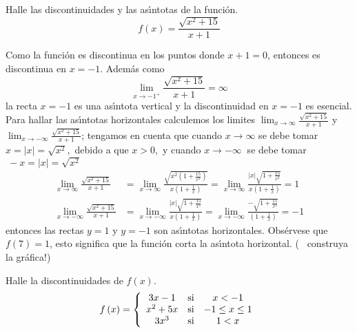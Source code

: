 \begin{example}
Halle las discontinuidades y las as\'{\i}ntotas de la funci\'{o}n.
\[
f(x)=\frac{\sqrt{x^{2}+15}}{x+1}
\]

\end{example}

\begin{sol}
Como la funci\'{o}n es discontinua en los puntos donde $x+1=0$, entonces es
discontinua en $x=-1$. Adem\'{a}s como
\[
\lim_{x\rightarrow-1^{+}}\frac{\sqrt{x^{2}+15}}{x+1}=\infty
\]
la recta $x=-1$ es una as\'{\i}ntota vertical y la discontinuidad en $x=-1$ es
esencial. Para hallar las as\'{\i}ntotas horizontales calculemos los limites
$\lim_{x\rightarrow\infty}\frac{\sqrt{x^{2}+15}}{x+1}$ y $\lim_{x\rightarrow
-\infty}\frac{\sqrt{x^{2}+15}}{x+1}$; tengamos en cuenta que cuando
$x\rightarrow\infty$ se debe tomar $x=\left|  x\right|  =\sqrt{x^{2}},$ debido
a que $x>0,$ y cuando $x\rightarrow-\infty\ $ se debe tomar $\ -x=\left|
x\right|  =\sqrt{x^{2}}$%
\begin{align*}
\lim_{x\rightarrow\infty}\frac{\sqrt{x^{2}+15}}{x+1}  &  =\lim_{x\rightarrow
\infty}\frac{\sqrt{x^{2}\left(  1+\frac{15}{x^{2}}\right)  }}{x\left(
1+\frac{1}{x}\right)  }=\lim_{x\rightarrow\infty}\frac{\left|  x\right|
\sqrt{1+\frac{15}{x^{2}}}}{x\left(  1+\frac{1}{x}\right)  }=1\\
\lim_{x\rightarrow-\infty}\frac{\sqrt{x^{2}+15}}{x+1}  &  =\lim_{x\rightarrow
-\infty}\frac{\left|  x\right|  \sqrt{1+\frac{15}{x^{2}}}}{x\left(  1+\frac
{1}{x}\right)  }=\lim_{x\rightarrow-\infty}\frac{-\sqrt{1+\frac{15}{x^{2}}}%
}{\left(  1+\frac{1}{x}\right)  }=-1
\end{align*}
entonces las rectas $y=1$ y $y=-1$ son as\'{\i}ntotas horizontales.
Obs\'{e}rvese que $f(7)=1$, esto significa que la funci\'{o}n corta la
as\'{\i}ntota horizontal. ( \textexclamdown \ construya la gr\'{a}fica!)
\end{sol}

\begin{example}
Halle la discontinuidades de $f(x)$.
\[
f\left(  x\right)  =\left\{
\begin{array}
[c]{ccc}%
3x-1 & \text{si} & x<-1\\
x^{2}+5x & \text{si} & -1\leq x\leq1\\
3x^{3} & \text{si} & 1<x
\end{array}
\right.
\]

\end{example}


